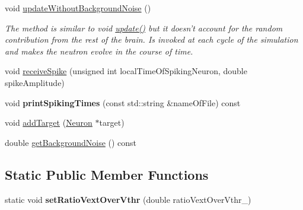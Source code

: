 \begin{DoxyCompactItemize}
void \hyperlink{classNeuron_ababbaa5bc5f7b2e00e0ae5ffcc8fbfdb}{update\-Without\-Background\-Noise} ()
\begin{DoxyCompactList}\small\item\em The method is similar to void \hyperlink{classNeuron_a782b3b728eee5097ab205a7a7990225b}{update()} but it doesn't account for the random contribution from the rest of the brain. Is invoked at each cycle of the simulation and makes the neutron evolve in the course of time. \end{DoxyCompactList}\item 
void \hyperlink{classNeuron_aa8111a347de6ddfb6c799bdcd3092cb7}{receive\-Spike} (unsigned int local\-Time\-Of\-Spiking\-Neuron, double spike\-Amplitude)
\item 
\hypertarget{classNeuron_a15b3eaa67535301e011d5cd8d53a61d1}{void {\bfseries print\-Spiking\-Times} (const std\-::string \&name\-Of\-File) const }\label{classNeuron_a15b3eaa67535301e011d5cd8d53a61d1}

\item 
void \hyperlink{classNeuron_a9bf071c800e76fa7fbd611cee7cd76d6}{add\-Target} (\hyperlink{classNeuron}{Neuron} $\ast$target)
\item 
double \hyperlink{classNeuron_a5487631e8982ae2368da0917535a9001}{get\-Background\-Noise} () const 
\end{DoxyCompactItemize}
\subsection*{Static Public Member Functions}
\begin{DoxyCompactItemize}
\item 
\hypertarget{classNeuron_ac1a73d639befdae8610674bb66c15831}{static void {\bfseries set\-Ratio\-Vext\-Over\-Vthr} (double ratio\-Vext\-Over\-Vthr\-\_\-)}\label{classNeuron_ac1a73d639befdae8610674bb66c15831}

\end{DoxyCompactItemize}
